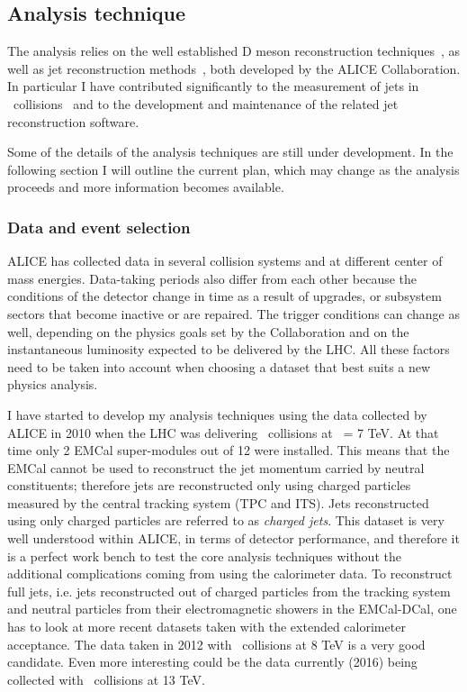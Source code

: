 \documentclass[12pt, a4paper, twoside, titlepage]{article}
\begin{document}
\subsection{Analysis technique}
The analysis relies on the well established D meson reconstruction techniques~\cite{ALICE:2012d, ALICE:2012e, ALICE:2014d, ALICE:2015c, ALICE:2015d, ALICE:2016a}, as well as
jet reconstruction methods~\cite{ALICE:2013c, ALICE:2014a, ALICE:2015e, ALICE:2015f}, both developed by the ALICE Collaboration. In particular I have
contributed significantly to the measurement of jets in \PbPb\ collisions~\cite{ALICE:2015a, Aiola:2013, Aiola:2014} and to the
development and maintenance of the related jet reconstruction software.

Some of the details of the analysis techniques are still under development. In the following section
I will outline the current plan, which may change as the analysis proceeds and more information becomes available.

\subsubsection{Data and event selection}
ALICE has collected data in several collision systems and at different center of mass energies.
Data-taking periods also differ from each other because the conditions of the detector change in time as a result of upgrades,
or subsystem sectors that become inactive or are repaired. The trigger conditions can change as well, depending on the
physics goals set by the Collaboration and on the instantaneous luminosity expected to be delivered by the LHC.
All these factors need to be taken into account when choosing a dataset that best suits a new physics analysis.

I have started to develop my analysis techniques using the data collected by ALICE in 2010 when the LHC was
delivering \pp\ collisions at \s\ = 7 TeV. At that time only 2 EMCal super-modules out of 12 were installed.
This means that the EMCal cannot be used to reconstruct the jet momentum carried by neutral constituents; therefore jets are
reconstructed only using charged particles measured by the central tracking system (TPC and ITS).
Jets reconstructed using only charged particles are referred to as \emph{charged jets}. This dataset is very
well understood within ALICE, in terms of detector performance, and therefore it is a perfect work bench
to test the core analysis techniques without the additional complications coming from using the calorimeter data.
To reconstruct full jets, i.e. jets reconstructed out of charged particles from the tracking system and neutral particles from their
electromagnetic showers in the EMCal-DCal, one has to look at more recent datasets taken with the extended calorimeter acceptance.
The data taken in 2012 with \pp\ collisions at 8 TeV is a very good candidate. Even more interesting could be the data currently (2016)
being collected with \pp\ collisions at 13 TeV.
\end{document}
